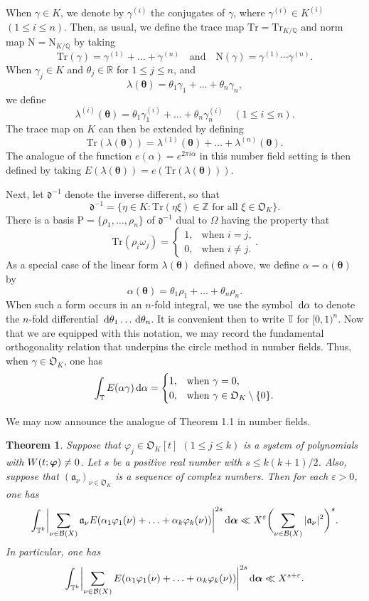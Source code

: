 \documentclass[12pt,reqno]{amsart}
\newtheorem{theorem}{Theorem}[section]
\theoremstyle{definition}
\theoremstyle{remark}
\numberwithin{equation}{section}
\def\calB{{\mathcal B}} \def\calBtil{{\widetilde \calB}}
\def\dbR{{\mathbb R}}\def\dbT{{\mathbb T}}
\def\dbZ{{\mathbb Z}}\def\dbQ{{\mathbb Q}}
\def\gra{{\mathfrak a}}\def\grA{{\mathfrak A}}\def\bfgra{{\boldsymbol \gra}}
\def\grd{{\mathfrak d}}\def\grD{{\mathfrak D}}
\def\grO{{\mathfrak O}}
\def\alp{{\alpha}} \def\bfalp{{\boldsymbol \alpha}}
\def\gam{{\gamma}} \def\Gam{{\Gamma}}
\def\tet{{\theta}} \def\bftet{{\boldsymbol \theta}}
\def\lam{{\lambda}} \def\Lam{{\Lambda}} \def\Lamtil{{\widetilde \Lambda}}
\def\Rho{{\mathrm P}}\def\bfrho{{\boldsymbol \rho}}
\def\ome{{\omega}} \def\Ome{{\Omega}}
\def\eps{\varepsilon}
\def\le{\leqslant} \def\ge{\geqslant} \def\pleq{\preccurlyeq} \def\ple{\prec}
\def\d{{\,{\rm d}}}
\begin{document}
When $\gam\in K$, we denote by $\gam^{(i)}$ the conjugates of $\gam$, where 
$\gam^{(i)}\in K^{(i)}$ $(1\le i\le n)$. Then, as usual, we define the trace map 
$\text{Tr}=\text{Tr}_{K/\dbQ}$ and norm map $\text{N}=\text{N}_{K/\dbQ}$ by taking
$$\text{Tr}(\gam)=\gam^{(1)}+\ldots +\gam^{(n)}\quad \text{and}\quad 
\text{N}(\gam)=\gam^{(1)}\cdots \gam^{(n)}.$$
When $\gam_j\in K$ and $\tet_j\in \dbR$ for $1\le j\le n$, and
$$\lam(\bftet)=\tet_1\gam_1+\ldots +\tet_n\gam_n,$$
we define
$$\lam^{(i)}(\bftet)=\tet_1\gam_1^{(i)}+\ldots +\tet_n\gam_n^{(i)}\quad (1\le i\le n).$$
The trace map on $K$ can then be extended by defining
$$\text{Tr}(\lam(\bftet))=\lam^{(1)}(\bftet)+\ldots +\lam^{(n)}(\bftet).$$
The analogue of the function $e(\alp)=e^{2\pi i\alp}$ in this number field setting is then 
defined by taking $E(\lam(\bftet))=e(\text{Tr}(\lam(\bftet)))$.\par

Next, let $\grd^{-1}$ denote the inverse different, so that
$$\grd^{-1}=\{\eta\in K:\text{$\text{Tr}(\eta \xi)\in \dbZ$ for all $\xi\in \grO_K$}\}.$$ 
There is a basis $\Rho=\{ \rho_1,\ldots ,\rho_n\}$ of $\grd^{-1}$ dual to $\Ome$ having 
the property that
$$\text{Tr}(\rho_i\ome_j)=\begin{cases}1,&\text{when $i=j$,}\\
0,&\text{when $i\ne j$.}\end{cases}.$$
As a special case of the linear form $\lam(\bftet)$ defined above, we define 
$\alp=\alp(\bftet)$ by
$$\alp(\bftet)=\tet_1\rho_1+\ldots +\tet_n\rho_n.$$
When such a form occurs in an $n$-fold integral, we use the symbol $\d\alp$ to denote the 
$n$-fold differential $\d\tet_1\ldots \d\tet_n$. It is convenient then to write $\dbT$ for 
$[0,1)^n$. Now that we are equipped with this notation, we may record the fundamental 
orthogonality relation that underpins the circle method in number fields. Thus, when 
$\gam\in \grO_K$, one has
\begin{equation}\label{15.1}
\int_\dbT E(\alp \gam)\d\alp =\begin{cases} 1,&\text{when $\gam=0$,}\\
0,&\text{when $\gam\in \grO_K\setminus \{0\}$.}\end{cases}
\end{equation}

We may now announce the analogue of Theorem 1.1 in number fields.

\begin{theorem}\label{theorem15.1} Suppose that $\varphi_j\in \grO_K[t]$ $(1\le j\le k)$ is 
a system of polynomials with $W(t;{\boldsymbol \varphi})\ne 0$. Let $s$ be a positive real number with 
$s\le k(k+1)/2$. Also, suppose that $(\gra_\nu)_{\nu\in \grO_K}$ is a sequence of 
complex numbers. Then for each $\eps>0$, one has
$$\int_{\dbT^k}\biggl| \sum_{\nu\in \calB(X)}\gra_\nu 
E(\alp_1\varphi_1(\nu)+\ldots +\alp_k\varphi_k(\nu))\biggr|^{2s}\d\bfalp \ll X^\eps 
\biggl( \sum_{\nu\in \calB(X)}|\gra_\nu|^2\biggr)^s.$$
In particular, one has
$$\int_{\dbT^k}\biggl| \sum_{\nu\in \calB(X)}E(\alp_1\varphi_1(\nu)+\ldots 
+\alp_k\varphi_k(\nu))\biggr|^{2s}\d\bfalp \ll X^{s+\eps}.$$
\end{theorem}
\end{document}
